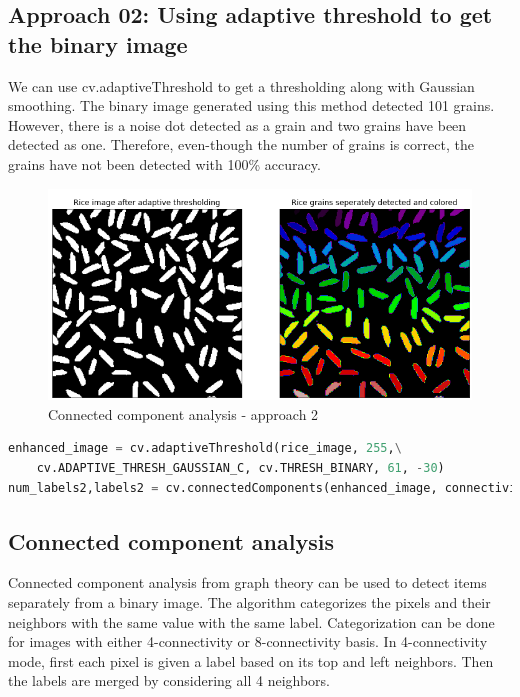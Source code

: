 \documentclass[11pt, a4paper]{article}
\begin{document}
\subsection{Approach 02: Using adaptive threshold to get the binary image}
\begin{minipage}{.39\textwidth}
We can use cv.adaptiveThreshold to get a thresholding along with Gaussian smoothing. The binary image generated using this method detected 101 grains. However, there is a noise dot detected as a grain and two grains have been detected as one. Therefore, even-though the number of grains is correct, the grains have not been detected with 100\% accuracy.
\end{minipage}
\hfill
\begin{minipage}{.59\textwidth}
\begin{figure}[H]
	\centering
	\includegraphics[width=\textwidth]{./Outputs/Rice2.png}
	\caption{Connected component analysis - approach 2}
	\label{fig:CCA image2}
\end{figure}
\end{minipage}

\begin{lstlisting}[language=python]
enhanced_image = cv.adaptiveThreshold(rice_image, 255,\
	cv.ADAPTIVE_THRESH_GAUSSIAN_C, cv.THRESH_BINARY, 61, -30)
num_labels2,labels2 = cv.connectedComponents(enhanced_image, connectivity = 4)
\end{lstlisting}

\subsection{Connected component analysis}
Connected component analysis from graph theory can be used to detect items separately from a binary image. The algorithm categorizes the pixels and their neighbors with the same value with the same label. Categorization can be done for images with either 4-connectivity or 8-connectivity basis. In 4-connectivity mode, first each pixel is given a label based on its top and left neighbors. Then the labels are merged by considering all 4 neighbors.
\end{document}
